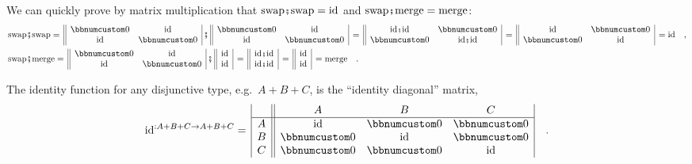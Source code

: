 We can quickly prove by matrix multiplication that $\text{swap}\bef\text{swap}=\text{id}$
and $\text{swap}\bef\text{merge}=\text{merge}$:\vspace{0\baselineskip}
\begin{align*}
 & \text{swap}\bef\text{swap}=\,\begin{array}{||cc|}
\bbnum 0 & \text{id}\\
\text{id} & \bbnum 0
\end{array}\,\bef\,\begin{array}{||cc|}
\bbnum 0 & \text{id}\\
\text{id} & \bbnum 0
\end{array}\,=\,\begin{array}{||cc|}
\text{id}\bef\text{id} & \bbnum 0\\
\bbnum 0 & \text{id}\bef\text{id}
\end{array}\,=\,\begin{array}{||cc|}
\text{id} & \bbnum 0\\
\bbnum 0 & \text{id}
\end{array}\,=\text{id}\quad,\\
 & \text{swap}\bef\text{merge}=\,\begin{array}{||cc|}
\bbnum 0 & \text{id}\\
\text{id} & \bbnum 0
\end{array}\,\bef\,\begin{array}{||c|}
\text{id}\\
\text{id}
\end{array}\,=\,\begin{array}{||c|}
\text{id}\bef\text{id}\\
\text{id}\bef\text{id}
\end{array}\,=\,\begin{array}{||c|}
\text{id}\\
\text{id}
\end{array}\,=\text{merge}\quad.
\end{align*}

The identity function for any disjunctive type, e.g.~$A+B+C$, is
the \textsf{``}identity diagonal\textsf{''} matrix,
\[
\text{id}^{:A+B+C\rightarrow A+B+C}=\,\begin{array}{|c||ccc|}
 & A & B & C\\
\hline A & \text{id} & \bbnum 0 & \bbnum 0\\
B & \bbnum 0 & \text{id} & \bbnum 0\\
C & \bbnum 0 & \bbnum 0 & \text{id}
\end{array}\quad.
\]

